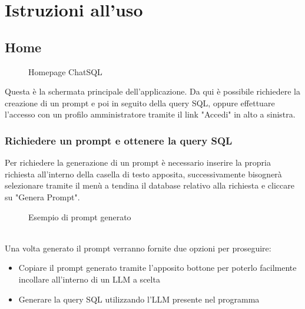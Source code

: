 \documentclass[5pt]{article}
\begin{document}
    \section{Istruzioni all'uso}
	    \subsection{Home}
	    \begin{figure}[ht]
	    	\centering
	    	\caption{Homepage ChatSQL}
	    \end{figure}
	    Questa è la schermata principale dell'applicazione. Da qui è possibile richiedere la creazione di un prompt e poi in seguito della query SQL, oppure effettuare l'accesso con un profilo amministratore tramite il link "Accedi" in alto a sinistra.
	    
	    \subsubsection{Richiedere un prompt e ottenere la query SQL}
	    Per richiedere la generazione di un prompt è necessario inserire la propria richiesta all'interno della casella di testo apposita, successivamente bisognerà selezionare tramite il menù a tendina il database relativo alla richiesta e cliccare su "Genera Prompt".
	    \begin{figure}[ht]
	    	\centering
	    	\caption{Esempio di prompt generato}
	    \end{figure}\\
	    Una volta generato il prompt verranno fornite due opzioni per proseguire:
	    \begin{itemize}
	    	\item Copiare il prompt generato tramite l'apposito bottone per poterlo facilmente incollare all'interno di un LLM a scelta
	    	\item Generare la query SQL utilizzando l'LLM presente nel programma %
	    \end{itemize} 
	    
\end{document}
